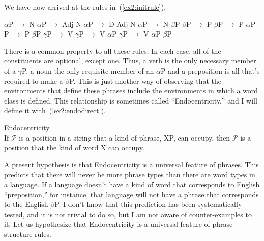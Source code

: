 We have now arrived at the rules in~(\ref{ex2:initrule}).
\begin{exe}
\ex \label{ex2:initrule} 
\begin{xlist}
		\ex $\alpha$P $\rightarrow$ N
		\ex $\alpha$P $\rightarrow$ Adj N 
		\ex $\alpha$P $\rightarrow$ D Adj N 
		\ex $\alpha$P $\rightarrow$ N $\beta$P
		\ex $\beta$P $\rightarrow$ P
	\ex $\beta$P $\rightarrow$ P $\alpha$P
	\ex {\be}P $\rightarrow$ P $\beta$P
	\ex $\gamma$P $\rightarrow$ V 
	\ex $\gamma$P $\rightarrow$ V $\alpha$P
	\ex $\gamma$P $\rightarrow$ V $\alpha$P $\beta$P
\end{xlist}
\end{exe}
There is a common property to all these rules. In each case, all of the constituents are optional, except one. Thus, a verb is the only necessary member of a $\gamma$P, a noun the only requisite member of an $\alpha$P and a preposition is all that's required to make a $\beta$P. This is just another way of observing that the environments that define these phrases include the environments in which a word class is defined. This relationship is sometimes called ``Endocentricity,'' and I will define it with~(\ref{ex2:endodirect}).%
%
%
%
\begin{exe}
	\raggedright
	\ex \label{ex2:endodirect} Endocentricity\\
	If $\mathcal{P}$ is a position in a string that a kind of phrase, XP, can occupy, then $\mathcal{P}$ is a position that the kind of word X can occupy.
\end{exe}
A present hypothesis is that Endocentricity is a universal feature of phrases. This predicts that there will never be more phrase types than there are word types in a language. If a language doesn't have a kind of word that corresponds to English ``preposition,'' for instance, that language will not have a phrase that corresponds to the English $\beta$P. I don't know that this prediction has been systematically tested, and it is not trivial to do so, but I am not aware of counter-examples to it. Let us hypothesize that Endocentricity is a universal feature of phrase structure rules. 

